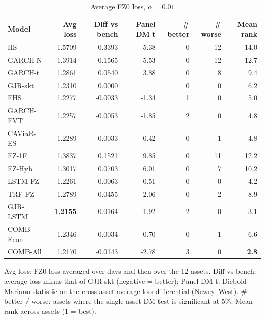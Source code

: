 \begin{table}[htbp]
\centering
\footnotesize
\caption{Average FZ0 loss, $\alpha=0.01$}
\label{tab:loss_a010}
\begin{tabular}{lrrrrrr}
\toprule
Model & Avg loss & Diff vs bench & Panel DM t & \# better & \# worse & Mean rank \\
\midrule
HS & 1.5709 & 0.3393 & 5.38 & 0 & 12 & 14.0 \\
GARCH-N & 1.3914 & 0.1565 & 5.53 & 0 & 12 & 12.7 \\
GARCH-t & 1.2861 & 0.0540 & 3.88 & 0 & 8 & 9.4 \\
GJR-skt & 1.2310 & 0.0000 &  & 0 & 0 & 6.2 \\
FHS & 1.2277 & -0.0033 & -1.34 & 1 & 0 & 5.0 \\
GARCH-EVT & 1.2257 & -0.0053 & -1.85 & 2 & 0 & 4.8 \\
CAViaR-ES & 1.2289 & -0.0033 & -0.42 & 0 & 1 & 4.8 \\
FZ-1F & 1.3837 & 0.1521 & 9.85 & 0 & 11 & 12.2 \\
FZ-Hyb & 1.3017 & 0.0703 & 6.01 & 0 & 7 & 10.2 \\
LSTM-FZ & 1.2261 & -0.0063 & -0.51 & 0 & 0 & 4.2 \\
TRF-FZ & 1.2789 & 0.0455 & 2.06 & 0 & 2 & 8.9 \\
GJR-LSTM & \textbf{1.2155} & -0.0164 & -1.92 & 2 & 0 & 3.1 \\
COMB-Econ & 1.2346 & 0.0034 & 0.70 & 0 & 1 & 6.6 \\
COMB-All & 1.2170 & -0.0143 & -2.78 & 3 & 0 & \textbf{2.8} \\
\bottomrule
\end{tabular}
\par\smallskip\parbox{\linewidth}{\scriptsize Avg loss: FZ0 loss averaged over days and then over the 12 assets. Diff vs bench: average loss minus that of GJR-skt (negative = better); Panel DM t: Diebold--Mariano statistic on the cross-asset average loss differential (Newey--West). \# better / worse: assets where the single-asset DM test is significant at 5\%. Mean rank across assets (1 = best).}
\end{table}